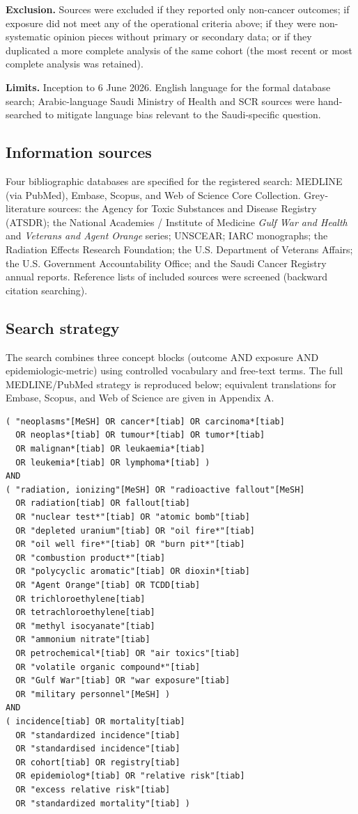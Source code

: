 \documentclass[3p,times]{elsarticle}
\begin{document}
\textbf{Exclusion.} Sources were excluded if they reported only non-cancer outcomes; if exposure did not meet any of the operational criteria above; if they were non-systematic opinion pieces without primary or secondary data; or if they duplicated a more complete analysis of the same cohort (the most recent or most complete analysis was retained).

\textbf{Limits.} Inception to 6 June 2026. English language for the formal database search; Arabic-language Saudi Ministry of Health and SCR sources were hand-searched to mitigate language bias relevant to the Saudi-specific question.

\subsection{Information sources}
Four bibliographic databases are specified for the registered search: MEDLINE (via PubMed), Embase, Scopus, and Web of Science Core Collection. Grey-literature sources: the Agency for Toxic Substances and Disease Registry (ATSDR); the National Academies / Institute of Medicine \emph{Gulf War and Health} and \emph{Veterans and Agent Orange} series; UNSCEAR; IARC monographs; the Radiation Effects Research Foundation; the U.S. Department of Veterans Affairs; the U.S. Government Accountability Office; and the Saudi Cancer Registry annual reports. Reference lists of included sources were screened (backward citation searching).

\subsection{Search strategy}
The search combines three concept blocks (outcome AND exposure AND epidemiologic-metric) using controlled vocabulary and free-text terms. The full MEDLINE/PubMed strategy is reproduced below; equivalent translations for Embase, Scopus, and Web of Science are given in Appendix A.

{\footnotesize
\begin{verbatim}
( "neoplasms"[MeSH] OR cancer*[tiab] OR carcinoma*[tiab]
  OR neoplas*[tiab] OR tumour*[tiab] OR tumor*[tiab]
  OR malignan*[tiab] OR leukaemia*[tiab]
  OR leukemia*[tiab] OR lymphoma*[tiab] )
AND
( "radiation, ionizing"[MeSH] OR "radioactive fallout"[MeSH]
  OR radiation[tiab] OR fallout[tiab]
  OR "nuclear test*"[tiab] OR "atomic bomb"[tiab]
  OR "depleted uranium"[tiab] OR "oil fire*"[tiab]
  OR "oil well fire*"[tiab] OR "burn pit*"[tiab]
  OR "combustion product*"[tiab]
  OR "polycyclic aromatic"[tiab] OR dioxin*[tiab]
  OR "Agent Orange"[tiab] OR TCDD[tiab]
  OR trichloroethylene[tiab]
  OR tetrachloroethylene[tiab]
  OR "methyl isocyanate"[tiab]
  OR "ammonium nitrate"[tiab]
  OR petrochemical*[tiab] OR "air toxics"[tiab]
  OR "volatile organic compound*"[tiab]
  OR "Gulf War"[tiab] OR "war exposure"[tiab]
  OR "military personnel"[MeSH] )
AND
( incidence[tiab] OR mortality[tiab]
  OR "standardized incidence"[tiab]
  OR "standardised incidence"[tiab]
  OR cohort[tiab] OR registry[tiab]
  OR epidemiolog*[tiab] OR "relative risk"[tiab]
  OR "excess relative risk"[tiab]
  OR "standardized mortality"[tiab] )
\end{verbatim}
}
\end{document}
